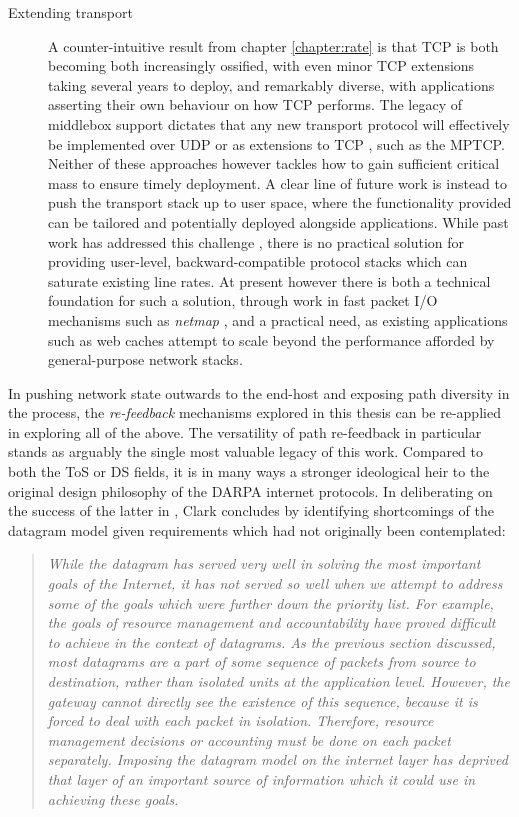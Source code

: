 \begin{description}
\item[Extending transport]{
A counter-intuitive result from chapter \ref{chapter:rate} is that \ac{TCP} is both becoming both increasingly ossified, with even minor \ac{TCP} extensions taking several years to deploy, and remarkably diverse, with applications asserting their own behaviour on how \ac{TCP} performs.
The legacy of middlebox support dictates that any new transport protocol will effectively be implemented over \acs{UDP} or as extensions to \ac{TCP} \cite{Honda11}, such as the \ac{MPTCP}.
Neither of these approaches however tackles how to gain sufficient critical mass to ensure timely deployment.
A clear line of future work is instead to push the transport stack up to user space, where the functionality provided can be tailored and potentially deployed alongside applications.
While past work has addressed this challenge \cite{Thekkath93,sctpuser}, there is no practical solution for providing user-level, backward-compatible protocol stacks which can saturate existing line rates. 
At present however there is both a technical foundation for such a solution, through work in fast packet \acs{I/O} mechanisms such as \emph{netmap} \cite{Rizzo12acmq}, and a practical need, as existing applications such as web caches attempt to scale beyond the performance afforded by general-purpose network stacks.
}
\end{description}

In pushing network state outwards to the end-host and exposing path diversity in the process, the \emph{re-feedback} mechanisms explored in this thesis can be re-applied in exploring all of the above.
The versatility of path re-feedback in particular stands as arguably the single most valuable legacy of this work.
Compared to both the \ac{ToS} or \ac{DS} fields, it is in many ways a stronger ideological heir to the original design philosophy of the \acs{DARPA} internet protocols.
In deliberating on the success of the latter in \cite{Clark:1988p478}, Clark concludes by identifying shortcomings of the datagram model given requirements which had not originally been contemplated:

\begin{quote}
\textit{While the datagram has served very well in solving the most important goals of the Internet, it has not served so well when we attempt to address some of the goals which were further down the priority list. 
For example, the goals of resource management and accountability have proved difficult to achieve in the context of datagrams.
As the previous section discussed, most datagrams are a part of some sequence of packets from source to destination, rather than isolated units at the application level.  
However, the gateway cannot directly see the existence of this sequence, because it is forced to deal with each packet in isolation.  
Therefore, resource management decisions or accounting must be done on each packet separately.  
Imposing the datagram model on the internet layer has deprived that layer of an important source of information which it could use in achieving these goals.}
\end{quote}

